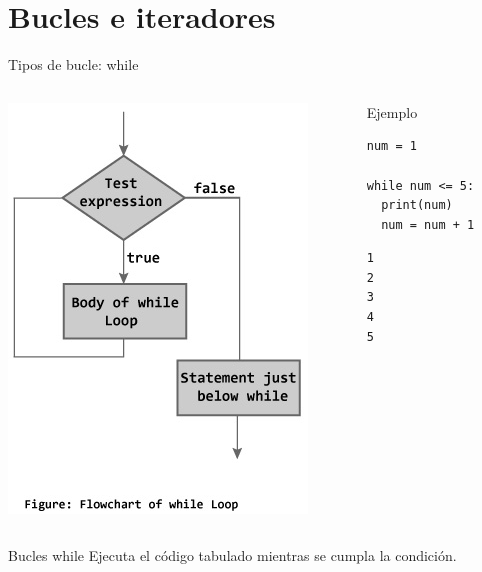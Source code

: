 \documentclass[bigger,unknownkeysallowed]{beamer}
\begin{document}
\section{Bucles e iteradores}
\label{sec:orgd6df1e8}

\begin{frame}[fragile,label={sec:orgc326a6d}]{Tipos de bucle: while}
 \begin{columns}
\begin{column}{0.4\columnwidth}
\begin{center}
\begin{center}
\includegraphics[width=.8\textwidth]{while.jpg}
\end{center}
\end{center}
\end{column}

\begin{column}{0.6\columnwidth}
\begin{block}{Ejemplo}
\begin{verbatim}
num = 1

while num <= 5:
  print(num)
  num = num + 1
\end{verbatim}
\scriptsize
\begin{verbatim}
1
2
3
4
5
\end{verbatim}
\end{block}
\end{column}
\end{columns}


\begin{block}{Bucles while}
Ejecuta el código tabulado mientras se cumpla la condición.
\end{block}
\end{frame}
\end{document}
